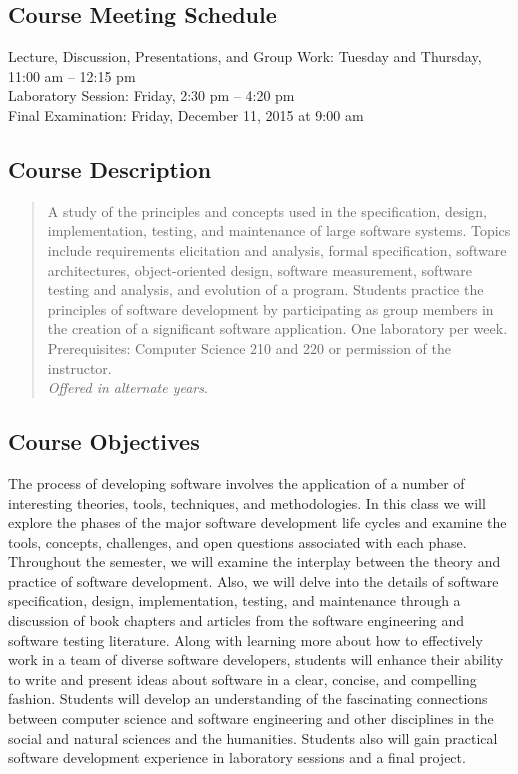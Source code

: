 \subsection*{Course Meeting Schedule}

Lecture, Discussion, Presentations, and Group Work: Tuesday and Thursday, 11:00 am -- 12:15 pm \\
Laboratory Session: Friday, 2:30 pm -- 4:20 pm \\
Final Examination: Friday, December 11, 2015 at 9:00 am

\subsection*{Course Description}

\begin{quote}

    A study of the principles and concepts used in the specification, design, implementation, testing, and maintenance
    of large software systems. Topics include requirements elicitation and analysis, formal specification, software
    architectures, object-oriented design, software measurement, software testing and analysis, and evolution of a
    program.  Students practice the principles of software development by participating as group members in the creation
    of a significant software application. One laboratory per week. Prerequisites: Computer Science 210 and 220 or
    permission of the instructor. \\ {\em Offered in alternate years}.

\end{quote}

\subsection*{Course Objectives}

The process of developing software involves the application of a number of interesting theories, tools, techniques, and
methodologies.  In this class we will explore the phases of the major software development life cycles and examine the
tools, concepts, challenges, and open questions associated with each phase.  Throughout the semester, we will examine
the interplay between the theory and practice of software development.  Also, we will delve into the details of software
specification, design, implementation, testing, and maintenance through a discussion of book chapters and articles from
the software engineering and software testing literature.  Along with learning more about how to effectively work in a
team of diverse software developers, students will enhance their ability to write and present ideas about software in a
clear, concise, and compelling fashion.  Students will develop an understanding of the fascinating connections
between computer science and software engineering and other disciplines in the social and natural sciences and the
humanities.  Students also will gain practical software development experience in laboratory sessions and a final
project.

